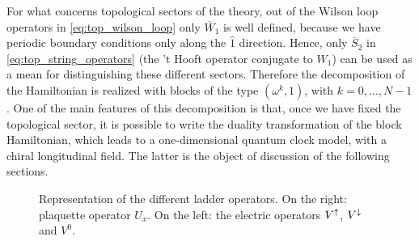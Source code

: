 For what concerns topological sectors of the theory,
out of the Wilson loop operators in \eqref{eq:top_wilson_loop} only $\overline{W}_1$ is well defined, because we have periodic boundary conditions only along the $\hat{1}$ direction.
Hence, only $\overline{S}_2$ in \eqref{eq:top_string_operators} (the 't Hooft operator conjugate to $W_1$) can be used as a mean for distinguishing these different sectors.
Therefore the decomposition of the Hamiltonian is realized with blocks of the type $(\omega^k,1)$, with $k=0,\dots,N-1$.
One of the main features of this decomposition is that, once we have fixed the topological sector, it is possible to write the duality transformation of the block Hamiltonian, which leads to a one-dimensional quantum clock model, with a chiral longitudinal field.
The latter is the object of discussion of the following sections.


\begin{figure}
    \centering
    
    \caption{Representation of the different ladder operators. On the right: plaquette operator $U_x$. On the left: the electric operators $V^{\uparrow}$, $V^{\downarrow}$ and $V^0$.}
    \label{fig:ladder_operators}
\end{figure}
